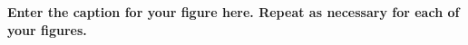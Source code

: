 \textbf{\label{fig:01} Enter the caption for your figure here.  Repeat as  necessary for each of your figures.}